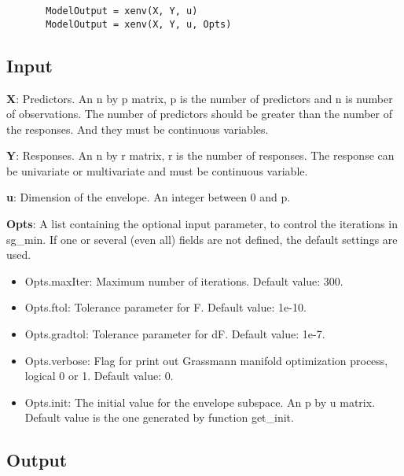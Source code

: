 \documentclass[a4paper,11pt,openany]{memoir}
\begin{document}
\begin{verbatim}       ModelOutput = xenv(X, Y, u)
       ModelOutput = xenv(X, Y, u, Opts)\end{verbatim}
    

\subsection*{Input}

\begin{par}
\textbf{X}: Predictors. An n by p matrix, p is the number of predictors and n is number of observations. The number of predictors should be greater than the number of the responses. And they must be continuous variables.
\end{par} \vspace{1em}
\begin{par}
\textbf{Y}: Responses. An n by r matrix, r is the number of responses. The response can be univariate or multivariate and must be continuous variable.
\end{par} \vspace{1em}
\begin{par}
\textbf{u}: Dimension of the envelope. An integer between 0 and p.
\end{par} \vspace{1em}
\begin{par}
\textbf{Opts}: A list containing the optional input parameter, to control the iterations in sg\_min. If one or several (even all) fields are not defined, the default settings are used.
\end{par} \vspace{1em}
\begin{itemize}
\setlength{\itemsep}{-1ex}
   \item Opts.maxIter: Maximum number of iterations.  Default value: 300.
   \item Opts.ftol: Tolerance parameter for F.  Default value: 1e-10.
   \item Opts.gradtol: Tolerance parameter for dF.  Default value: 1e-7.
   \item Opts.verbose: Flag for print out Grassmann manifold optimization process, logical 0 or 1. Default value: 0.
      \item Opts.init: The initial value for the envelope subspace. An p by u matrix. Default value is the one generated by function get\_init.
\end{itemize}


\subsection*{Output}
\end{document}
